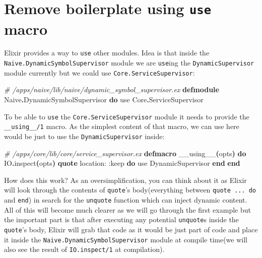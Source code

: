 \documentclass[
  oneside]{book}
\newenvironment{Shaded}{\begin{snugshade}}{\end{snugshade}}
\newcommand{\CommentTok}[1]{\textcolor[rgb]{0.56,0.35,0.01}{\textit{#1}}}
\newcommand{\ConstantTok}[1]{\textcolor[rgb]{0.56,0.35,0.01}{#1}}
\newcommand{\FunctionTok}[1]{\textcolor[rgb]{0.13,0.29,0.53}{\textbf{#1}}}
\newcommand{\ImportTok}[1]{#1}
\newcommand{\KeywordTok}[1]{\textcolor[rgb]{0.13,0.29,0.53}{\textbf{#1}}}
\newcommand{\NormalTok}[1]{#1}
\newcommand{\OperatorTok}[1]{\textcolor[rgb]{0.81,0.36,0.00}{\textbf{#1}}}
\newcommand{\VariableTok}[1]{\textcolor[rgb]{0.00,0.00,0.00}{#1}}
\begin{document}
\section{\texorpdfstring{Remove boilerplate using \texttt{use} macro}{Remove boilerplate using use macro}}\label{remove-boilerplate-using-use-macro}

Elixir provides a way to \texttt{use} other modules. Idea is that inside the \texttt{Naive.DynamicSymbolSupervisor} module we are \texttt{use}ing the \texttt{DynamicSupervisor} module currently but we could use \texttt{Core.ServiceSupervisor}:

\begin{Shaded}
\begin{Highlighting}[]
\CommentTok{\# /apps/naive/lib/naive/dynamic\_symbol\_supervisor.ex}
\KeywordTok{defmodule} \ConstantTok{Naive}\OperatorTok{.}\ConstantTok{DynamicSymbolSupervisor} \KeywordTok{do}
  \ImportTok{use} \ConstantTok{Core}\OperatorTok{.}\ConstantTok{ServiceSupervisor}
\end{Highlighting}
\end{Shaded}

To be able to \texttt{use} the \texttt{Core.ServiceSupervisor} module it needs to provide the \texttt{\_\_using\_\_/1} macro. As the simplest content of that macro, we can use here would be just to use the \texttt{DynamicSupervisor} inside:

\begin{Shaded}
\begin{Highlighting}[]
  \CommentTok{\# /apps/core/lib/core/service\_supervisor.ex}
  \KeywordTok{defmacro}\NormalTok{ \_\_using\_\_}\FunctionTok{(}\NormalTok{opts}\FunctionTok{)} \KeywordTok{do}
    \ConstantTok{IO}\OperatorTok{.}\NormalTok{inspect}\FunctionTok{(}\NormalTok{opts}\FunctionTok{)}
    \KeywordTok{quote} \VariableTok{location:} \VariableTok{:keep} \KeywordTok{do}
      \ImportTok{use} \ConstantTok{DynamicSupervisor}
    \KeywordTok{end}
  \KeywordTok{end}
\end{Highlighting}
\end{Shaded}

How does this work? As an oversimplification, you can think about it as Elixir will look through the contents of \texttt{quote}'s body(everything between \texttt{quote\ ...\ do} and \texttt{end}) in search for the \texttt{unquote} function which can inject dynamic content. All of this will become much clearer as we will go through the first example but the important part is that after executing any potential \texttt{unquote}s inside the \texttt{quote}'s body, Elixir will grab that code as it would be just part of code and place it inside the \texttt{Naive.DynamicSymbolSupervisor} module at compile time(we will also see the result of \texttt{IO.inspect/1} at compilation).
\end{document}
